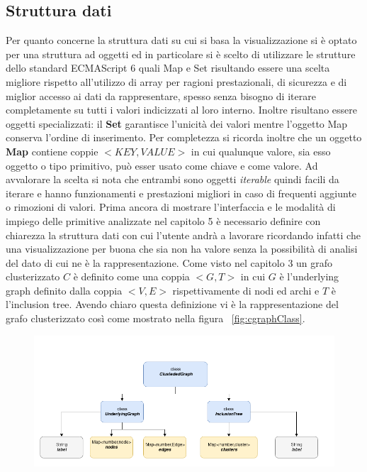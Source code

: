 {\subsection{Struttura dati}
Per quanto concerne la struttura dati su cui si basa la visualizzazione si è optato per una struttura ad oggetti ed in particolare si è scelto di utilizzare le strutture dello standard ECMAScript 6 quali Map e Set risultando essere una scelta migliore rispetto all'utilizzo di array per ragioni prestazionali, di sicurezza e di miglior accesso ai dati da rappresentare, spesso senza bisogno di iterare completamente su tutti i valori indicizzati al loro interno. Inoltre risultano essere oggetti specializzati: il \textbf{Set} garantisce l'unicità dei valori mentre l'oggetto Map conserva l'ordine di inserimento. Per completezza si ricorda inoltre che un oggetto \textbf{Map} contiene coppie $<KEY,VALUE>$ in cui qualunque valore, sia esso oggetto o tipo primitivo, può esser usato come chiave e come valore. Ad avvalorare la scelta si nota che entrambi sono oggetti \textit{iterable} quindi facili da iterare e hanno funzionamenti e prestazioni migliori in caso di frequenti aggiunte o rimozioni di valori.
Prima ancora di mostrare l'interfaccia e le modalità di impiego delle primitive analizzate nel capitolo 5 è necessario definire con chiarezza la struttura dati con cui l'utente andrà a lavorare ricordando infatti che una visualizzazione per buona che sia non ha valore senza la possibilità di analisi del dato di cui ne è la rappresentazione.
Come visto nel capitolo 3 un grafo clusterizzato $C$ è definito come una coppia $<G,T>$ in cui $G$ è l'underlying graph definito dalla coppia $<V,E>$ rispettivamente di nodi ed archi e $T$ è l'inclusion tree. Avendo chiaro questa definizione vi è la rappresentazione del grafo clusterizzato così come mostrato nella figura \figurename~\ref{fig:cgraphClass}.
\newpage
\begin{figure}[!htb]
	\begin{center}
		\includegraphics[width=1 \linewidth]{figure/cgraphClass}

\end{center}
\end{figure}}
